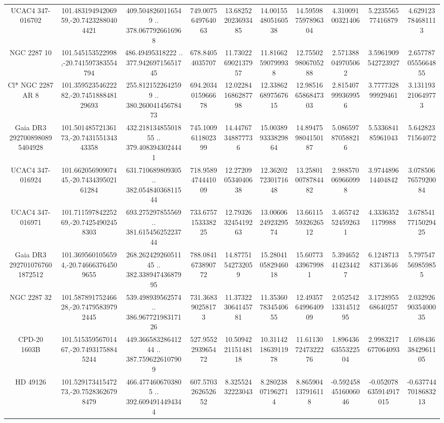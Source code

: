 \begin{table}
\begin{tabular}{cccccccccc}
UCAC4 347-016702 & 101.48319494206959,-20.74232880404421 & 409.5048260116549 .. 378.0677926616968 & 749.0075649764063 & 13.682522023693485 & 14.001554805160538 & 14.595987597896304 & 4.31009100321406 & 5.223556577416879 & 4.629123784681113 \\
NGC  2287    10 & 101.545153522998,-20.741597383554794 & 486.49495318222 .. 377.94269715651745 & 678.84054035707 & 11.730226902137957 & 11.81662590799938 & 12.755029806705288 & 2.571388049705062 & 3.5961909542723927 & 2.6577870555664855 \\
Cl* NGC 2287     AR       8 & 101.35952354622282,-20.745188848129693 & 255.8121522642599 .. 380.26004145678473 & 694.2034015966678 & 12.022841686287798 & 12.338626897567615 & 12.985166586847303 & 2.815407999369956 & 3.777732899929461 & 3.131193210649773 \\
Gaia DR3 2927008980895404928 & 101.50148572136173,-20.743155134343358 & 432.21813485501855 .. 379.4083943024441 & 745.1009611802399 & 14.44767348877736 & 15.003899333829864 & 14.894759804150187 & 5.086597870588216 & 5.533684185961043 & 5.64282371564072 \\
UCAC4 347-016924 & 101.66205690907445,-20.743439502161284 & 631.710689809305 .. 382.05484036811544 & 718.9589474441009 & 12.272090534040638 & 12.362027230171648 & 13.258010078784482 & 2.988570069660998 & 3.974489614404842 & 3.0785067657920084 \\
UCAC4 347-016971 & 101.71159784225269,-20.74254902458303 & 693.275297855569 .. 381.61545625223744 & 733.6757153338225 & 12.793263245419263 & 13.006062492329574 & 13.661155932626512 & 3.465742524592631 & 4.33363521179988 & 3.6785417715029425 \\
Gaia DR3 2927010767601872512 & 101.3695601056594,-20.746663764509655 & 268.26242926051145 .. 382.33894743687995 & 788.0841673890772 & 14.87751542732059 & 15.280410582946018 & 15.60773439679981 & 5.394652414234427 & 6.124871383713646 & 5.797547569859855 \\
NGC  2287    32 & 101.58789175246628,-20.74795839792445 & 539.498939562574 .. 386.96772198317126 & 731.368390258173 & 11.373223064145781 & 11.353607834540655 & 12.493576499640909 & 2.0525421331451295 & 3.172895568640257 & 2.0329269035400035 \\
CPD-20  1603B & 101.51535956701467,-20.74931758845244 & 449.36658328641244 .. 387.7596226107909 & 527.9552293965472 & 10.509422115148118 & 10.311421863911978 & 11.611307247322276 & 1.8964366355322504 & 2.9983217677064093 & 1.6984363842961105 \\
HD  49126 & 101.52917341547273,-20.75283626798479 & 466.4774606703805 .. 392.6094914494344 & 607.5703262652652 & 8.32552432223043 & 8.280238071962714 & 8.865904137916118 & -0.5924584516006046 & -0.052078635914917015 & -0.6377447018683213 \\

\end{tabular}
\end{table}
